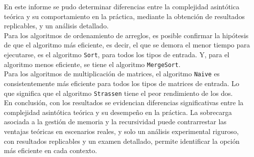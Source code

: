 En este informe se pudo determinar diferencias entre la complejidad asintótica teórica y su comportamiento en la práctica, mediante la obtención de resultados replicables, y un análisis detallado.\\
Para los algoritmos de ordenamiento de arreglos, es posible confirmar la hipótesis de que el algoritmo más eficiente, es decir, el que se demora el menor tiempo para ejecutarse, es el algoritmo \texttt{Sort}, para todos los tipos de entrada. Y, para el algoritmo menos eficiente, se tiene el algoritmo \texttt{MergeSort}.\\
Para los algoritmos de multiplicación de matrices, el algoritmo \texttt{Naive} es consistentemente más eficiente para todos los tipos de matrices de entrada. Lo que significa que el algoritmo \texttt{Strassen} tiene el peor rendimiento de los dos.\\
En conclusión, con los resultados se evidencian diferencias significativas entre la complejidad asintótica teórica y su desempeño en la práctica. La sobrecarga asociada a la gestión de memoria y la recursividad puede contrarrestar las ventajas teóricas en escenarios reales, y solo un análisis experimental riguroso, con resultados replicables y un examen detallado, permite identificar la opción más eficiente en cada contexto.

